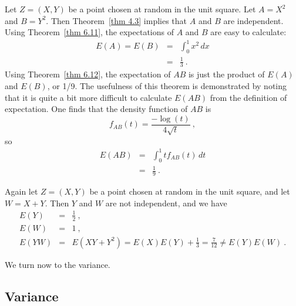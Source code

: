 {\begin{example}\label{exam 6.19} Let $Z = (X, Y)$ be a point chosen at random in the
unit square.  Let $A = X^2$ and
$B = Y^2$.  Then Theorem~\ref{thm 4.3} implies that $A$ and $B$ are independent.
Using Theorem~\ref{thm 6.11}, the expectations of $A$ and $B$ are easy to calculate:
\begin{eqnarray*} E(A) = E(B) & = & \int_0^1 x^2\,dx \\ & = & \frac 13\ .
\end{eqnarray*} Using Theorem~\ref{thm 6.12}, the expectation of $AB$ is just the
product of $E(A)$ and
$E(B)$, or 1/9.  The usefulness of this theorem is demonstrated by noting that  it is
quite a bit more difficult to calculate $E(AB)$ from the definition of expectation. 
One finds that the density function of $AB$ is
$$f_{AB}(t) = \frac {-\log(t)}{4\sqrt t}\ ,$$ so
\begin{eqnarray*} E(AB) & = & \int_0^1 t f_{AB}(t)\,dt \\ & = & \frac 19\ .
\end{eqnarray*}
\end{example}

\begin{example}\label{exam 6.20} Again let $Z = (X, Y)$ be a point chosen at random
in the unit square, and let $W = X + Y$.    Then $Y$ and $W$ are not independent, and
we have
\begin{eqnarray*} E(Y) & = &\frac 12\ , \\ E(W) & = & 1\ , \\ E(YW) & = & E(XY + Y^2)
= E(X)E(Y) + \frac 13 = \frac 7{12}
\ne E(Y)E(W)\ .
\end{eqnarray*}
\end{example}

We turn now to the variance.


\subsection*{Variance}

}
